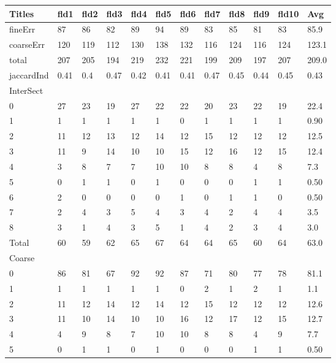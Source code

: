 \documentclass[ms]{nuthesis}
\begin{document}
\FloatBarrier
\begin{table}[h]
  \centering
  \begin{tabular}{|l||l||l||l||l||l||l||l||l||l||l||l|}\toprule
    Titles & fld1 & fld2 & fld3 & fld4 & fld5 & fld6 & fld7 & fld8 & fld9 & fld10 & Avg \\ \midrule
    fineErr & 87 & 86 & 82 & 89 & 94 & 89 & 83 & 85 & 81 & 83 & 85.9 \\
    coarseErr & 120 & 119 & 112 & 130 & 138 & 132 & 116 & 124 & 116 & 124 & 123.1 \\
    total & 207 & 205 & 194 & 219 & 232 & 221 & 199 & 209 & 197 & 207 & 209.0 \\
    jaccardInd & 0.41 & 0.4 & 0.47 & 0.42 & 0.41 & 0.41 & 0.47 & 0.45 & 0.44 & 0.45 & 0.43 \\
    InterSect &  &  &  &  &  &  &  &  &  &  &  \\
    0 & 27 & 23 & 19 & 27 & 22 & 22 & 20 & 23 & 22 & 19 & 22.4 \\
    1 & 1 & 1 & 1 & 1 & 1 & 0 & 1 & 1 & 1 & 1 & 0.90 \\
    2 & 11 & 12 & 13 & 12 & 14 & 12 & 15 & 12 & 12 & 12 & 12.5 \\
    3 & 11 & 9 & 14 & 10 & 10 & 15 & 12 & 16 & 12 & 15 & 12.4 \\
    4 & 3 & 8 & 7 & 7 & 10 & 10 & 8 & 8 & 4 & 8 & 7.3 \\
    5 & 0 & 1 & 1 & 0 & 1 & 0 & 0 & 0 & 1 & 1 & 0.50 \\
    6 & 2 & 0 & 0 & 0 & 0 & 1 & 0 & 1 & 1 & 0 & 0.50 \\
    7 & 2 & 4 & 3 & 5 & 4 & 3 & 4 & 2 & 4 & 4 & 3.5 \\
    8 & 3 & 1 & 4 & 3 & 5 & 1 & 4 & 2 & 3 & 4 & 3.0 \\
    Total & 60 & 59 & 62 & 65 & 67 & 64 & 64 & 65 & 60 & 64 & 63.0 \\
    Coarse &  &  &  &  &  &  &  &  &  &  &  \\
    0 & 86 & 81 & 67 & 92 & 92 & 87 & 71 & 80 & 77 & 78 & 81.1 \\
    1 & 1 & 1 & 1 & 1 & 1 & 0 & 2 & 1 & 2 & 1 & 1.1 \\
    2 & 11 & 12 & 14 & 12 & 14 & 12 & 15 & 12 & 12 & 12 & 12.6 \\
    3 & 11 & 10 & 14 & 10 & 10 & 16 & 12 & 17 & 12 & 15 & 12.7 \\
    4 & 4 & 9 & 8 & 7 & 10 & 10 & 8 & 8 & 4 & 9 & 7.7 \\
    5 & 0 & 1 & 1 & 0 & 1 & 0 & 0 & 0 & 1 & 1 & 0.50 \\

\end{tabular}
\end{table}
\end{document}
